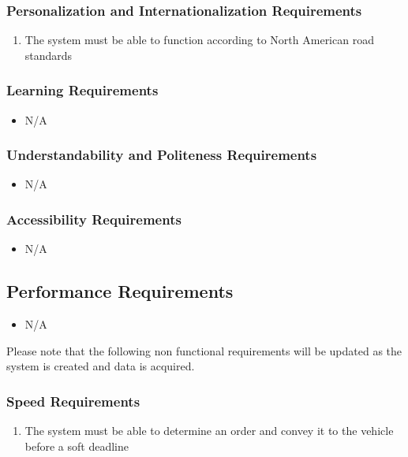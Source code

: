 \documentclass [12pt]{article}
\begin{document}
\subsubsection{Personalization and Internationalization Requirements}
	\begin{enumerate}[label=\textbf{\Alph*}:]
		\item The system must be able to function according to North American road standards
	\end{enumerate}

\subsubsection{Learning Requirements }
	\begin{itemize}
		\item N/A
	\end{itemize}

\subsubsection{Understandability and Politeness Requirements}
	\begin{itemize}
		\item N/A
	\end{itemize}
		
\subsubsection{Accessibility Requirements }
	\begin{itemize}
		\item N/A
	\end{itemize}
 
\subsection{Performance Requirements}
	\begin{itemize}
		\item N/A
	\end{itemize}
	Please note that the following  non functional requirements will be updated as the system is created and data is acquired.

\subsubsection{Speed Requirements }
	\begin{enumerate}[label=\textbf{\Alph*}:]
		\item The system must be able to determine an order and convey it to the vehicle before a soft deadline
	\end{enumerate}
\end{document}
